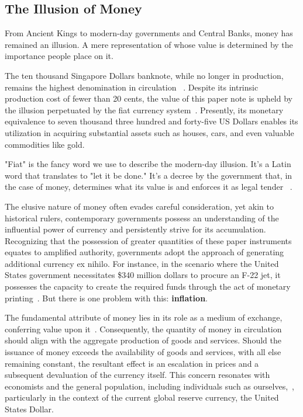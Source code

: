 \subsection{The Illusion of Money}
From Ancient Kings to modern-day governments and Central Banks, money has remained an illusion. A mere representation of whose value is determined by the importance people place on it.

The ten thousand Singapore Dollars banknote, while no longer in production, remains the highest denomination in circulation ~\cite{goodhart1998}. Despite its intrinsic production cost of fewer than 20 cents, the value of this paper note is upheld by the illusion perpetuated by the fiat currency system~\cite{gupta2019}. Presently, its monetary equivalence to seven thousand three hundred and forty-five US Dollars enables its utilization in acquiring substantial assets such as houses, cars, and even valuable commodities like gold.

"Fiat" is the fancy word we use to describe the modern-day illusion. It's a Latin word that translates to "let it be done." It's a decree by the government that, in the case of money, determines what its value is and enforces it as legal tender ~\cite{reinhart2018, friedman2000}.

The elusive nature of money often evades careful consideration, yet akin to historical rulers, contemporary governments possess an understanding of the influential power of currency and persistently strive for its accumulation. Recognizing that the possession of greater quantities of these paper instruments equates to amplified authority, governments adopt the approach of generating additional currency ex nihilo. For instance, in the scenario where the United States government necessitates \$340 million dollars to procure an F-22 jet, it possesses the capacity to create the required funds through the act of monetary printing~\cite{graeber2011, mankiw2014}. But there is one problem with this: \textbf{inflation}.

The fundamental attribute of money lies in its role as a medium of exchange, conferring value upon it~\cite{mankiw2014}. Consequently, the quantity of money in circulation should align with the aggregate production of goods and services. Should the issuance of money exceeds the availability of goods and services, with all else remaining constant, the resultant effect is an escalation in prices and a subsequent devaluation of the currency itself. This concern resonates with economists and the general population, including individuals such as ourselves,~\cite{blinder2010}, particularly in the context of the current global reserve currency, the United States Dollar.

